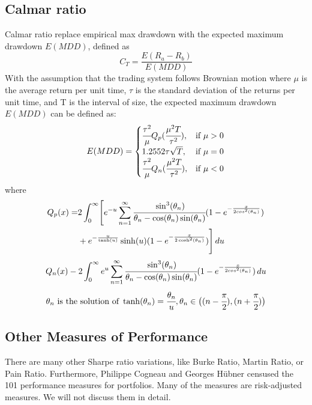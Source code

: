 \subsection{Calmar ratio}
Calmar ratio\cite{young1991calmar} replace empirical max drawdown with the expected maximum drawdown \(E(MDD)\), defined as 
\[C_T = \frac{E(R_a - R_b)}{E(MDD)}\]
With the assumption that the trading system follows Brownian motion where \(\mu\) is the average return per unit time, \(\tau\) is the standard deviation of the returns per unit time, and T is the interval of size, the expected maximum drawdown \(E(MDD)\) can be defined as\cite{1196267,pratap2004maximum}:
\[E(MDD)=
\begin{cases}
    \cfrac{\tau^2}{\mu}Q_p(\cfrac{\mu^2T}{\tau^2}),&\text{if  }\mu > 0\\
    1.2552 \tau \sqrt{T},& \text{if  }\mu=0 \\
    \cfrac{\tau^2}{\mu}Q_n(\cfrac{\mu^2T}{\tau^2}),&\text{if  }\mu <0
\end{cases}
\]
where
\[
\begin{aligned}
Q_p(x) = &2\int_0^\infty\Biggl[
    e^{-u}\sum_{n=1}^{\infty}
    \cfrac{\sin^3(\theta_n)}{\theta_n-\cos(\theta_n)\sin(\theta_n)}
    (1-e^{-\frac{x}{2cos^2(\theta_n)}})\\
    &+e^{-\frac{u}{\tanh(u)}}\sinh(u)
    (1-e^{-\frac{x}{2\cosh^2(\theta_n)}})
    \Biggr]\,du
\end{aligned}
\]
\[
Q_n(x)-2\int_0^\infty e^u \sum_{n=1}^{\infty}
\cfrac{\sin^3(\theta_n)}{\theta_n-\cos(\theta_n)\sin(\theta_n)}
(1-e^{-\frac{x}{2cos^2(\theta_n)}})
\,du
\]
\[
\theta_n \text{ is the solution of }
 \tanh(\theta_n) =\cfrac{\theta_n}{u},
 \theta_n \in \bigl( (n-\cfrac{\pi}{2}),(n+\cfrac{\pi}{2})\bigr)
\]

\subsection{Other Measures of Performance}
There are many other Sharpe ratio variations, like Burke Ratio, Martin Ratio, or Pain Ratio\cite{bacon2009sharp}. Furthermore, Philippe Cogneau and Georges Hübner censused the 101 performance measures for portfolios. Many of the measures are risk-adjusted measures.\cite{cogneau2009101,cogneau2009more,cogneau2009more2} We will not discuss them in detail.